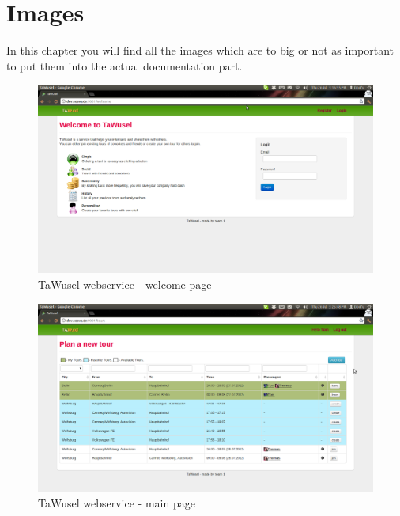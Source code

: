 \thispagestyle{fancy}

\chapter{Images}
In this chapter you will find all the images which are to big or not as important to put them into the actual documentation part.

\begin{figure}[h]
	\includegraphics[width=16cm]{images/TaWusel_Web_Login.png}
	\caption{TaWusel webservice - welcome page}
	\label{img:WebLogin}
\end{figure}

\begin{figure}[h]
	\includegraphics[width=16cm]{images/TaWusel_Web_main.png}
	\caption{TaWusel webservice - main page}
	\label{img:WebMain}
\end{figure}


